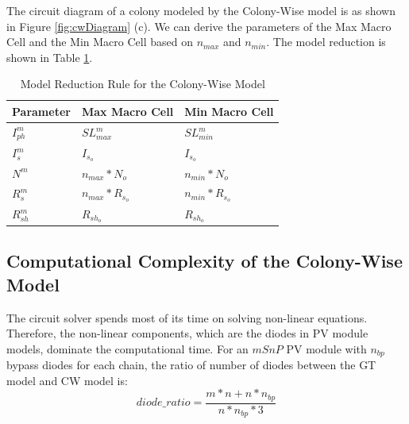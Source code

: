 The circuit diagram of a colony modeled by the Colony-Wise model is as shown in Figure \ref{fig:cwDiagram} (c). We can derive the parameters of the Max Macro Cell and the Min Macro Cell based on $n_{max}$ and $n_{min}$. The model reduction is shown in Table \ref{table:cwRule}.

\begin{table}[tb]
  \caption{Model Reduction Rule for the Colony-Wise Model }
  \label{table:cwRule}
  \centering
  \normalsize
\begin{tabular}{|l|l|l|}
  \hline
  Parameter & Max Macro Cell & Min Macro Cell \\
  \hline
  $I_{ph}^m$ & $SL_{max}^m$ & $SL_{min}^m$ \\
  \hline
  $I_s^m$ & $I_{s_o}$ & $I_{s_o}$ \\
  \hline
  $N^m$ & $n_{max}*N_o$ & $n_{min}*N_o$ \\
  \hline
  $R_s^m$ & $n_{max}*R_{s_o}$ & $n_{min}*R_{s_o}$ \\
  \hline
  $R_{sh}^m$ & $R_{sh_o}$ & $R_{sh_o}$ \\
  \hline
\end{tabular}
\end{table}

\subsection{Computational Complexity of the Colony-Wise Model}
The circuit solver spends most of its time on solving non-linear equations. Therefore, the non-linear components, which are the diodes in PV module models, dominate the computational time. For an $mSnP$ PV module with $n_{bp}$ bypass diodes for each chain, the ratio of number of diodes between the GT model and CW model is:
\begin{equation}\label{equ:diodeRatioGTCW}
  diode\_ratio = \frac{m*n+n*n_{bp}}{n*n_{bp}*3}
\end{equation}





